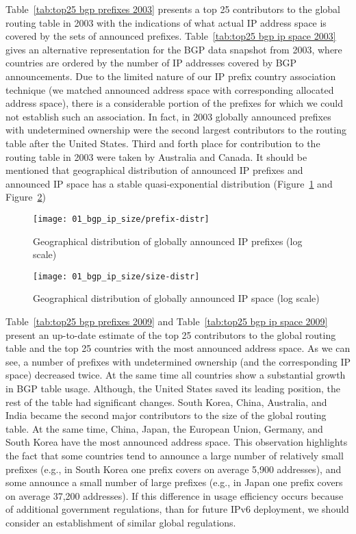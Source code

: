 Table~\ref{tab:top25 bgp prefixes 2003} presents a top 25 contributors to the
global routing table in 2003 with the indications of what actual IP address
space is covered by the sets of announced prefixes. Table~\ref{tab:top25 bgp
ip space 2003} gives an alternative representation for the BGP data snapshot
from 2003, where countries are ordered by the number of IP addresses covered
by BGP announcements. Due to the limited nature of our IP prefix country
association technique (we matched announced address space with corresponding
allocated address space), there is a considerable portion of the prefixes for
which we could not establish such an association. In fact, in 2003 globally
announced prefixes with undetermined ownership were the second largest
contributors to the routing table after the United States. Third and forth
place for contribution to the routing table in 2003 were taken by Australia
and Canada. It should be mentioned that geographical distribution of announced
IP prefixes and announced IP space has a stable quasi-exponential distribution
(Figure~\ref{fig:prefix distr} and Figure~\ref{fig:size distr})

\begin{figure}[htbp]
	\centering
		\texttt{[image: 01\_bgp\_ip\_size/prefix-distr]}
	\caption{Geographical distribution of globally announced IP prefixes (log scale)}
	\label{fig:prefix distr}
\end{figure}

\begin{figure}[htbp]
	\centering
		\texttt{[image: 01\_bgp\_ip\_size/size-distr]}
	\caption{Geographical distribution of globally announced IP space (log scale)}
	\label{fig:size distr}
\end{figure}

Table~\ref{tab:top25 bgp prefixes 2009} and Table~\ref{tab:top25 bgp ip space
2009} present an up-to-date estimate of the top 25 contributors to the global
routing table and the top 25 countries with the most announced address space.
As we can see, a number of prefixes with undetermined ownership (and the
corresponding IP space) decreased twice. At the same time all countries show a
substantial growth in BGP table usage. Although, the United States saved its
leading position, the rest of the table had significant changes. South Korea,
China, Australia, and India became the second major contributors to the size
of the global routing table. At the same time, China, Japan, the European
Union, Germany, and South Korea have the most announced address space. This
observation highlights the fact that some countries tend to announce a large
number of relatively small prefixes (e.g., in South Korea one prefix covers on
average 5,900 addresses), and some announce a small number of large prefixes
(e.g., in Japan one prefix covers on average 37,200 addresses). If this
difference in usage efficiency occurs because of additional government
regulations, than for future IPv6 deployment, we should consider an
establishment of similar global regulations.

